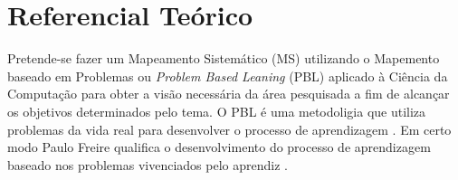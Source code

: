\documentclass[
	12pt,				%
	openright,			%
	oneside,
	a4paper,			%
	english,			%
	french,				%
	spanish,			%
	brazil,				%
	]{abntex2}
\begin{document}
	











\chapter{Referencial Teórico}

 Pretende-se fazer um Mapeamento Sistemático (MS) utilizando o Mapemento baseado em Problemas ou \textit{Problem Based Leaning} (PBL) aplicado à Ciência da Computação para obter a visão necessária da área pesquisada a fim de alcançar os objetivos determinados pelo tema. O PBL é uma metodoligia que utiliza problemas da vida real para desenvolver o processo de aprendizagem  \cite{Oliveira2012}.
Em certo modo Paulo Freire qualifica o desenvolvimento do processo de aprendizagem baseado nos problemas vivenciados pelo aprendiz \cite{Freire1987}. 
\end{document}
